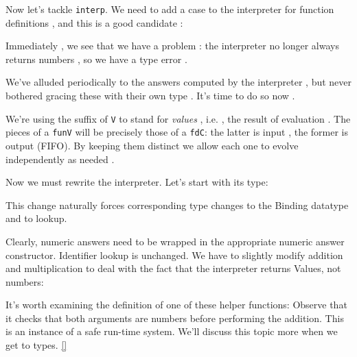 Now let’s tackle  \verb|interp|. We need to add
a case to the interpreter for function definitions , and this is a good
candidate :

Immediately , we see that we have a problem : the interpreter no longer always returns numbers
, so we have a type error .

We’ve alluded periodically to the answers computed by the interpreter , but
never bothered gracing these with their own type . It’s time to do so now
.

We’re using the suffix of  \verb|V| to stand for
\emph{values}  , i.e. , the result
of evaluation . The pieces of a  \verb|funV|
will be precisely those of a  \verb|fdC|: the latter
is input , the former is output  (FIFO). By
keeping them distinct  we allow each one  to evolve independently  as needed
.

Now we must rewrite the interpreter. Let’s start with its type:

This change naturally forces corresponding type changes to the Binding datatype
and to lookup.


Clearly, numeric answers need to be wrapped in the appropriate numeric answer
constructor. Identifier lookup is unchanged. We have to slightly modify addition
and multiplication to deal with the fact that the interpreter returns Values,
not numbers:

It’s worth examining the definition of one of these helper functions:
Observe that it checks that both arguments are numbers before performing the
addition. This is an instance of a safe run-time system. We’ll discuss this
topic more when we get to types. \ref{}

